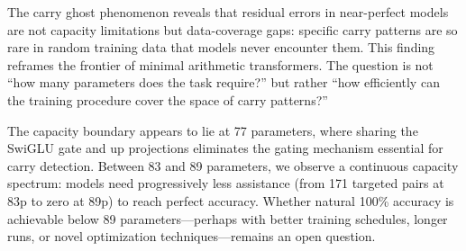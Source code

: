 \documentclass[11pt]{article}
\begin{document}
The carry ghost phenomenon reveals that residual errors in
near-perfect models are not capacity limitations but data-coverage gaps:
specific carry patterns are so rare in random training data that models
never encounter them. This finding reframes the frontier of minimal
arithmetic transformers. The question is not ``how many parameters does
the task require?'' but rather ``how efficiently can the training
procedure cover the space of carry patterns?''

The capacity boundary appears to lie at 77 parameters, where sharing the
SwiGLU gate and up projections eliminates the gating mechanism essential
for carry detection. Between 83 and 89 parameters, we observe a
continuous capacity spectrum: models need progressively less assistance
(from 171 targeted pairs at 83p to zero at 89p) to reach perfect
accuracy. Whether natural 100\% accuracy is achievable below 89
parameters---perhaps with better training schedules, longer runs, or
novel optimization techniques---remains an open question.



\end{document}
